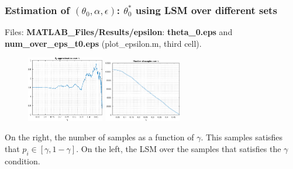 \documentclass[aspectratio=169]{beamer}\usepackage[utf8]{inputenc}
\begin{document}
\begin{frame}\frametitle{Estimation of $(\theta_0,\alpha,\epsilon)$: $\theta_0^*$ using LSM over different sets}

Files: \textbf{MATLAB\_Files/Results/epsilon}: \textbf{theta\_0.eps} and \textbf{num\_over\_eps\_t0.eps} (plot\_epsilon.m, third cell).\\

\begin{figure}[ht!]
\centering
\includegraphics[width=0.3\textwidth]{../../MATLAB_Files/Results/epsilon/theta_0.eps}\quad\quad
\includegraphics[width=0.3\textwidth]{../../MATLAB_Files/Results/epsilon/num_over_eps_t0.eps}
\end{figure}

On the right, the number of samples as a function of $\gamma$. This samples satisfies that $p_i\in[\gamma,1-\gamma]$. On the left, the LSM over the samples that satisfies the $\gamma$ condition.

\end{frame}

\end{document}

